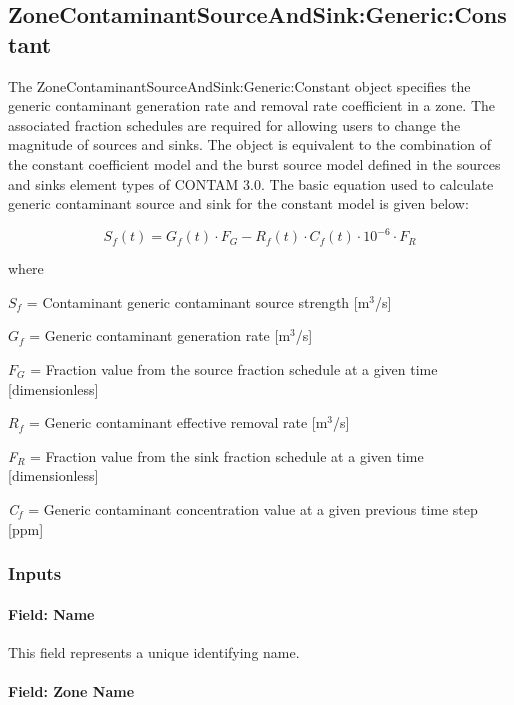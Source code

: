 \subsection{ZoneContaminantSourceAndSink:Generic:Constant}\label{zonecontaminantsourceandsinkgenericconstant}

The ZoneContaminantSourceAndSink:Generic:Constant object specifies the generic contaminant generation rate and removal rate coefficient in a zone. The associated fraction schedules are required for allowing users to change the magnitude of sources and sinks. The object is equivalent to the combination of the constant coefficient model and the burst source model defined in the sources and sinks element types of CONTAM 3.0. The basic equation used to calculate generic contaminant source and sink for the constant model is given below:

\begin{equation}
{S_f}(t) = {G_f}(t)\cdot{F_G} - {R_f}(t)\cdot{C_f}(t)\cdot 10^{-6}\cdot{F_R}
\end{equation}

where

$S_{f}$ = Contaminant generic contaminant source strength {[}m\(^{3}\)/s{]}

$G_{f}$ = Generic contaminant generation rate {[}m\(^{3}\)/s{]}

$F_{G}$ = Fraction value from the source fraction schedule at a given time {[}dimensionless{]}

$R_{f}$ = Generic contaminant effective removal rate {[}m\(^{3}\)/s{]}

\emph{F\(_{R}\)} = Fraction value from the sink fraction schedule at a given time {[}dimensionless{]}

\emph{C\(_{f}\)} = Generic contaminant concentration value at a given previous time step {[}ppm{]}

\subsubsection{Inputs}\label{inputs-11-007}

\paragraph{Field: Name}\label{field-name-11-006}

This field represents a unique identifying name.

\paragraph{Field: Zone Name}\label{field-zone-name-3-002}

